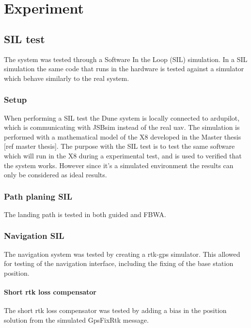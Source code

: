 \part{Experiment}

\chapter{SIL test}
The system was tested through a Software In the Loop (SIL) simulation. In a SIL simulation the same code that runs in the hardware is tested against a simulator which behave similarly to the real system.
\section{Setup}
When performing a SIL test the Dune system is locally connected to ardupilot, which is communicating with JSBsim instead of the real \gls{uav}. The simulation is performed with a mathematical model of the X8 developed in the Master thesis [ref master thesis]. The purpose with the SIL test is to test the same software which will run in the X8 during a experimental test, and is used to verified that the system works. However since it's a simulated environment the results can only be considered as ideal results.
\section{Path planing SIL}
The landing path is tested in both guided and FBWA. 
\section{Navigation SIL}
The navigation system was tested by creating a \gls{rtk-gps} simulator. This allowed for testing of the navigation interface, including the fixing of the base station position.

\subsection{Short rtk loss compensator}
The short rtk loss compensator was tested by adding a bias in the position solution from the simulated GpsFixRtk message. 
